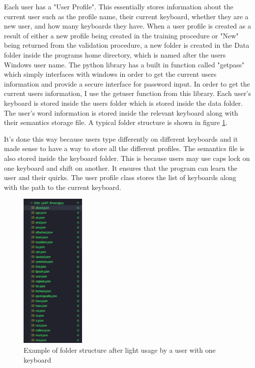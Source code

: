 \documentclass[10pt,a4paper]{report}
\begin{document}
Each user has a "User Profile". This essentially stores information about the current user such as the profile name, their current keyboard, whether they are a new user, and how many keyboards they have. When a user profile is created as a result of either a new profile being created in the training procedure or "New" being returned from the validation procedure, a new folder is created in the Data folder inside the programs home directory, which is named after the users Windows user name. The python library has a built in function called "getpass" which simply interfaces with windows in order to get the current users information and provide a secure interface for password input\cite{getuser}. In order to get the current users information, I use the getuser function from this library. Each user's keyboard is stored inside the users folder which is stored inside the data folder. The user's word information is stored inside the relevant keyboard along with their semantics storage file. A typical folder structure is shown in figure \ref{fig:foldStruct}.

It's done this way because users type differently on different keyboards and it made sense to have a way to store all the different profiles. The semantics file is also stored inside the keyboard folder. This is because users may use caps lock on one keyboard and shift on another. It ensures that the program can learn the user and their quirks. The user profile class stores the list of keyboards along with the path to the current keyboard.

\begin{figure}
	\begin{center}
		\includegraphics[width=0.28\textwidth]{FolderStruct}
	\end{center}
	\caption{Example of folder structure after light usage by a user with one keyboard}
	\label{fig:foldStruct}
\end{figure}
\end{document}
